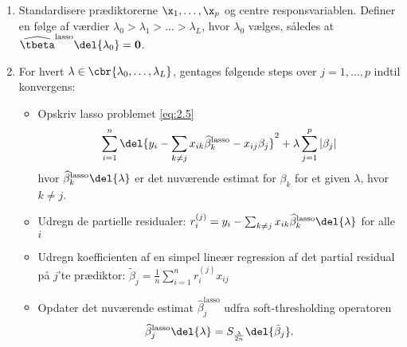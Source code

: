 %
\begin{alg} 
\begin{enumerate}
\item Standardisere prædiktorerne \(\x_1, \ldots, \x_p\) og centre responsvariablen.
Definer en følge af værdier \(\lambda_0 > \lambda_1 > \ldots > \lambda_L\), hvor \(\lambda_0\) vælges, således at \(\widehat{\tbeta}^\text{lasso} \del{\lambda_0} =\mathbf{0}\).
\item For hvert \(\lambda \in \cbr{\lambda_0, \ldots, \lambda_L}\), gentages følgende steps over \(j = 1, \ldots, p\) indtil konvergens:
\begin{itemize}
\item Opskriv lasso problemet \eqref{eq:2.5}
\begin{align*}
\sum_{i=1}^n \del{y_i - \sum_{k \neq j} x_{ik} \widehat{\beta}^\text{lasso}_k - x_{ij} \beta_j}^2 + \lambda \sum_{j = 1}^p \vert \beta_j \vert
\end{align*}
hvor \(\widehat{\beta}^\text{lasso}_k \del{\lambda}\) er det nuværende estimat for \(\beta_k\) for et given \(\lambda\), hvor \(k \neq j\).
\item Udregn de partielle residualer: \(r_{i}^{(j)} = y_i - \sum_{k \neq j} x_{ik} \widehat{\beta}^\text{lasso}_k \del{\lambda}\) for alle \(i\)
\item Udregn koefficienten af en simpel lineær regression af det partial residual på \(j\)'te prædiktor: \(\tilde{\beta}_j = \frac{1}{n} \sum_{i=1}^n r_{i}^{(j)} x_{ij}\) 
\item Opdater det nuværende estimat \(\widehat{\beta}^\text{lasso}_j\) udfra soft-thresholding operatoren
\begin{align}
\widehat{\beta}^\text{lasso}_j \del{\lambda}= S_{\frac{\lambda}{2n}} \del{\tilde{\beta}_j}. \label{eq:update_coordinate}
\end{align}
\end{itemize}
\end{enumerate}
\end{alg}
